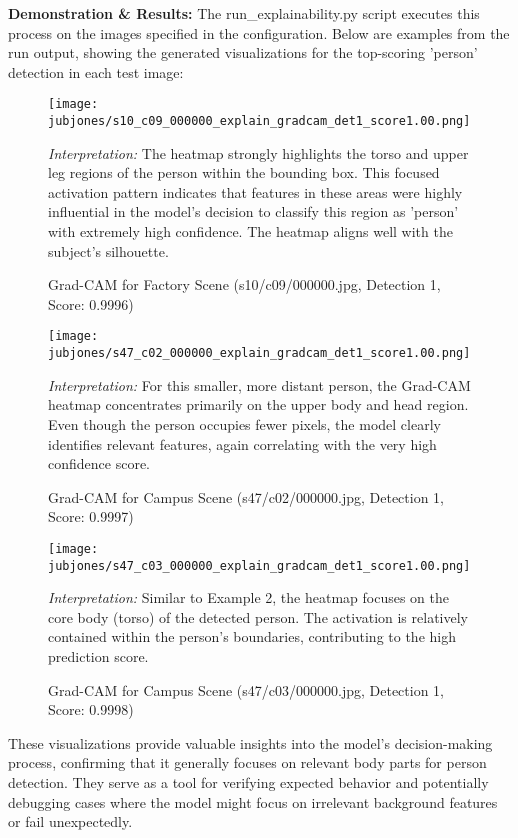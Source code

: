 \textbf{Demonstration \& Results:}
The {run\_explainability.py} script executes this process on the images specified in the configuration. Below are examples from the run output, showing the generated visualizations for the top-scoring 'person' detection in each test image:

\begin{figure}[!htb]
    \centering
    \texttt{[image: jubjones/s10\_c09\_000000\_explain\_gradcam\_det1\_score1.00.png]}
    \caption{Grad-CAM for Factory Scene (s10/c09/000000.jpg, Detection 1, Score: 0.9996)}
    \label{fig:gradcam_example1}
    \parbox{0.9\textwidth}{\footnotesize \textit{Interpretation:} The heatmap strongly highlights the torso and upper leg regions of the person within the bounding box. This focused activation pattern indicates that features in these areas were highly influential in the model's decision to classify this region as 'person' with extremely high confidence. The heatmap aligns well with the subject's silhouette.}
\end{figure}

\begin{figure}[!htb]
    \centering
    \texttt{[image: jubjones/s47\_c02\_000000\_explain\_gradcam\_det1\_score1.00.png]}
    \caption{Grad-CAM for Campus Scene (s47/c02/000000.jpg, Detection 1, Score: 0.9997)}
    \label{fig:gradcam_example2}
    \parbox{0.9\textwidth}{\footnotesize \textit{Interpretation:} For this smaller, more distant person, the Grad-CAM heatmap concentrates primarily on the upper body and head region. Even though the person occupies fewer pixels, the model clearly identifies relevant features, again correlating with the very high confidence score.}
\end{figure}

\begin{figure}[!htb]
    \centering
    \texttt{[image: jubjones/s47\_c03\_000000\_explain\_gradcam\_det1\_score1.00.png]}
    \caption{Grad-CAM for Campus Scene (s47/c03/000000.jpg, Detection 1, Score: 0.9998)}
    \label{fig:gradcam_example3}
    \parbox{0.9\textwidth}{\footnotesize \textit{Interpretation:} Similar to Example 2, the heatmap focuses on the core body (torso) of the detected person. The activation is relatively contained within the person's boundaries, contributing to the high prediction score.}
\end{figure}
\clearpage
These visualizations provide valuable insights into the model's decision-making process, confirming that it generally focuses on relevant body parts for person detection. They serve as a tool for verifying expected behavior and potentially debugging cases where the model might focus on irrelevant background features or fail unexpectedly.

